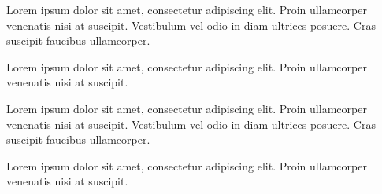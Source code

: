 \documentclass[]{plushcv}
\begin{document}
\begin{minipage}[t]{0.70\textwidth}
\begin{tightemize}
\item Lorem ipsum dolor sit amet, consectetur adipiscing elit. Proin ullamcorper venenatis nisi at suscipit. Vestibulum vel odio in diam ultrices posuere. Cras suscipit faucibus ullamcorper.
\item Lorem ipsum dolor sit amet, consectetur adipiscing elit. Proin ullamcorper venenatis nisi at suscipit.
\end{tightemize}
\sectionsep

\begin{tightemize}
\item Lorem ipsum dolor sit amet, consectetur adipiscing elit. Proin ullamcorper venenatis nisi at suscipit. Vestibulum vel odio in diam ultrices posuere. Cras suscipit faucibus ullamcorper. 
\item Lorem ipsum dolor sit amet, consectetur adipiscing elit. Proin ullamcorper venenatis nisi at suscipit.
\end{tightemize}
\sectionsep

%
%

\end{minipage} 
\hfill
\end{document}
